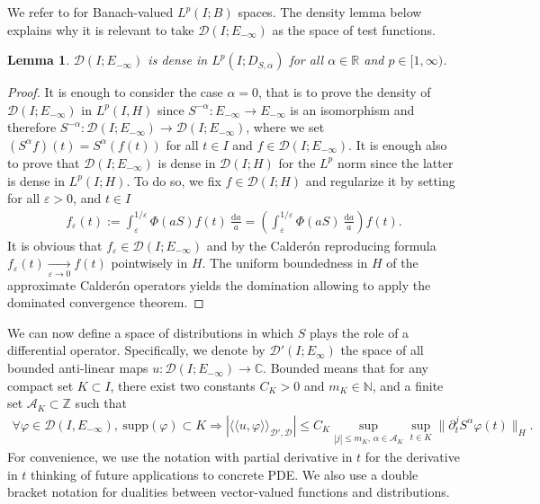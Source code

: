 \documentclass[11pt, letterpaper]{amsart}
\newtheorem{lem}[thm]{Lemma}
\theoremstyle{definition}
\theoremstyle{remark}
\newcommand{\llangle}{\langle\!\langle}
\newcommand{\rrangle}{\rangle\!\rangle}
\numberwithin{equation}{section}
\begin{document}
We refer to \cite{hytonen2016analysis} for Banach-valued $L^p(I;B)$ spaces. The density lemma below explains why it is relevant to take $\mathcal{D}(I;E_{-\infty})$ as the space of test functions.
\begin{lem}\label{Lemma density}
    $\mathcal{D}(I;E_{-\infty})$ is dense in $L^p(I; D_{S,\alpha})$ for all $\alpha \in \mathbb{R}$ and $p \in [1,\infty)$.
\end{lem}
\begin{proof}
     It is enough to consider the case $\alpha=0$, that is to prove the density of $\mathcal{D}(I;E_{-\infty})$ in $L^p(I, H)$ since $S^{-\alpha} : E_{-\infty} \rightarrow E_{-\infty}$ is an isomorphism and therefore $S^{-\alpha}: \mathcal{D}(I;E_{-\infty}) \rightarrow \mathcal{D}(I;E_{-\infty})$, where we set $(S^\alpha f)(t)=S^\alpha(f(t))$ for all $t\in I$ and $f\in \mathcal{D}(I;E_{-\infty})$. It is enough also to prove that $\mathcal{D}(I;E_{-\infty})$ is dense in $\mathcal{D}(I;H)$ for the $L^p$ norm since the latter is dense in $L^p(I; H)$. To do so, we fix $f \in \mathcal{D}(I;H)$ and regularize it by setting for all $\varepsilon>0$, and $t\in I$
\begin{align*}
    f_\varepsilon (t):= \int_{\varepsilon}^{1/\varepsilon} \Phi (aS)f(t)\ \frac{\mathrm d a}{a} =  \left ( \int_{\varepsilon}^{1/\varepsilon} \Phi (aS)\ \frac{\mathrm d a}{a} \right ) f(t).
\end{align*}
It is obvious that $f_\varepsilon \in \mathcal{D}( I ; E_{-\infty})$ and by the Calder\'on reproducing formula $f_\varepsilon(t) \underset{\varepsilon \to 0}{\rightarrow} f(t) $ pointwisely in $H$. The uniform boundedness in $H$ of the approximate Calder\'on operators yields the domination allowing to apply the dominated convergence theorem.
\end{proof}

 We can now define a space of distributions in which $S$ plays the role of a differential operator. Specifically, we denote by $\mathcal{D}'( I ; E_\infty)$ the space of all bounded anti-linear maps $u :  \mathcal{D}( I ; E_{-\infty})\to  \mathbb{C}$. Bounded means that for any compact set $K \subset  I $, there exist two constants $C_K >0$ and $m_K \in \mathbb{N}$, and a finite set $\mathcal{A}_K \subset \mathbb{Z}$ such that 
\begin{align*}
    \forall \varphi \in \mathcal{D}( I , E_{-\infty}), \ \mathrm{supp}(\varphi) \subset K \Rightarrow \left|\llangle u ,\varphi  \rrangle_{\mathcal{D}',\mathcal{D}} \right|\leq C_K \sup_{\left|j \right|\leq m_K,\,  \alpha \in \mathcal{A}_K} \sup_{t\in K} \|\partial_t^j S^\alpha \varphi(t) \|_H .
\end{align*}
For convenience, we use the notation with partial derivative in $t$ for the derivative in $t$ thinking of future applications to concrete PDE. We also use a double bracket notation for dualities between vector-valued functions and distributions. 
\end{document}
